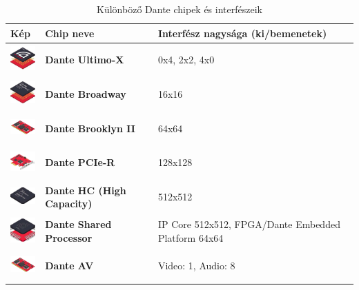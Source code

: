 \begin{table}[h!]
    \centering
    \begin{tabular}{|>{\centering\arraybackslash}m{3cm}|>{\centering\arraybackslash}m{5cm}|>{\centering\arraybackslash}m{4cm}|}
        \hline
        \textbf{Kép} & \textbf{Chip neve} & \textbf{Interfész nagysága (ki/bemenetek)} \\
        \hline
        \includegraphics[width=40px,height=40px,keepaspectratio]{figures/ultimo-x.jpg} & \textbf{Dante Ultimo-X} & 0x4, 2x2, 4x0 \\
        \hline
        \includegraphics[width=40px,height=40px,keepaspectratio]{figures/broadway.jpg} & \textbf{Dante Broadway} & 16x16 \\
        \hline
        \includegraphics[width=40px,height=40px,keepaspectratio]{figures/brooklyn-ii.jpg} & \textbf{Dante Brooklyn II} & 64x64 \\
        \hline
        \includegraphics[width=40px,height=40px,keepaspectratio]{figures/pcie-r.jpg} & \textbf{Dante PCIe-R} & 128x128 \\
        \hline
        \includegraphics[width=40px,height=40px,keepaspectratio]{figures/dante-hc.jpg} & \textbf{Dante HC (High Capacity)} & 512x512 \\
        \hline
        \includegraphics[width=40px,height=40px,keepaspectratio]{figures/shared-processor.jpg} & \textbf{Dante Shared Processor} & IP Core 512x512, FPGA/Dante Embedded Platform 64x64\\
        \hline
        \includegraphics[width=40px,height=40px,keepaspectratio]{figures/dante-av.jpg} & \textbf{Dante AV} & Video: 1, Audio: 8 \\
        \hline
    \end{tabular}
    \caption{Különböző Dante chipek és interfészeik}
    \label{tab:dante_chips}
\end{table}

